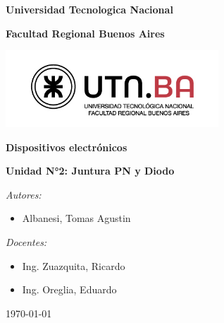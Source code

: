 \documentclass[main.tex]{subfiles}
\begin{document}
	
	\onecolumn
	
	\begin{center}
		\textbf{\fontsize{14}{\baselineskip}\selectfont Universidad Tecnologica Nacional}
		
		\bigskip
		
		\textbf{\fontsize{14}{\baselineskip}\selectfont Facultad Regional Buenos Aires}
		
		\bigskip
		
		\includegraphics[width=8cm]{utn-logo.jpg}
		
		\bigskip
		
		\textbf{\fontsize{20}{\baselineskip}\selectfont Dispositivos electrónicos}
		
		\bigskip
		
		\textbf{\fontsize{18}{\baselineskip}\selectfont Unidad N°2: Juntura PN y Diodo}
		
		\bigskip
		\bigskip
		\bigskip
		
		\textit{\fontsize{14}{\baselineskip}\selectfont Autores:}
		
		\bigskip
		
		\begin{itemize}{}
			\item \fontsize{14}{\baselineskip}\selectfont Albanesi, Tomas Agustin
		\end{itemize}
		
		\bigskip
		\bigskip
		
		\textit{\fontsize{14}{\baselineskip}\selectfont Docentes:}
		
		\bigskip
		
		\begin{itemize}
			\item \fontsize{14}{\baselineskip}\selectfont Ing. Zuazquita, Ricardo
			\item \fontsize{14}{\baselineskip}\selectfont Ing. Oreglia, Eduardo
		\end{itemize}
		
		\bigskip
		\bigskip
		
		{\today}
		
	\end{center}
	
	\clearpage
	
\end{document}
